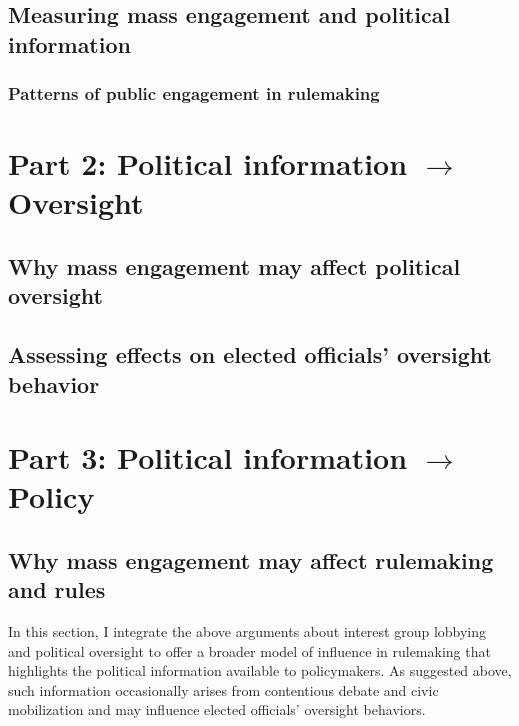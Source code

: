 \documentclass{article}
\begin{document}
\subsection{Measuring mass engagement and political information}
\label{whyMail-methods}

\subsubsection{Patterns of public engagement in rulemaking}
\label{whyMail-results}


\section{Part 2: Political information $\rightarrow$ Oversight}
\subsection{Why mass engagement may affect political oversight} \label{principals-intro}


\subsection{Assessing effects on elected officials' oversight behavior} \label{principals-methods}


\section{Part 3: Political information $\rightarrow$ Policy}
\subsection{Why mass engagement may affect rulemaking and rules} \label{influence-intro}

In this section, I integrate the above arguments about interest group lobbying and political oversight to offer a broader model of influence in rulemaking that highlights the political information available to policymakers. As suggested above, such information occasionally arises from contentious debate and civic mobilization and may influence elected officials' oversight behaviors. %


\end{document}
